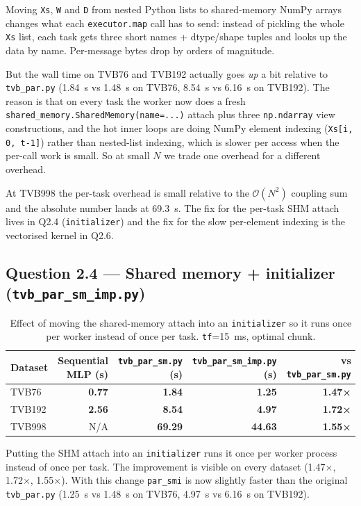 \documentclass[11pt,a4paper]{article}
\newcommand{\Q}[1]{\subsection*{Question #1}}
\begin{document}
Moving \texttt{Xs}, \texttt{W} and \texttt{D} from nested Python
lists to shared-memory NumPy arrays changes what each
\texttt{executor.map} call has to send: instead of pickling the whole
\texttt{Xs} list, each task gets three short names + dtype/shape
tuples and looks up the data by name. Per-message bytes drop by
orders of magnitude.

But the wall time on TVB76 and TVB192 actually goes \emph{up} a bit
relative to \texttt{tvb\_par.py} (1.84~s vs 1.48~s on TVB76, 8.54~s
vs 6.16~s on TVB192). The reason is that on every task the worker
now does a fresh \texttt{shared\_memory.SharedMemory(name=...)}
attach plus three \texttt{np.ndarray} view constructions, and the
hot inner loops are doing NumPy element indexing (\texttt{Xs[i, 0,
t-1]}) rather than nested-list indexing, which is slower per access
when the per-call work is small. So at small $N$ we trade one
overhead for a different overhead.

At TVB998 the per-task overhead is small relative to the
$\mathcal{O}(N^2)$ coupling sum and the absolute number lands at
69.3~s. The fix for the per-task SHM attach lives in Q2.4
(\texttt{initializer}) and the fix for the slow per-element
indexing is the vectorised kernel in Q2.6.

\Q{2.4 — Shared memory + initializer (\texttt{tvb\_par\_sm\_imp.py})}

\begin{table}[h]
\centering
\small
\begin{tabular}{lrrrr}
\toprule
Dataset & Sequential MLP (s) & \texttt{tvb\_par\_sm.py} (s) & \texttt{tvb\_par\_sm\_imp.py} (s) & vs \texttt{tvb\_par\_sm.py} \\
\midrule
TVB76  & \textbf{0.77}  & \textbf{1.84}  & \textbf{1.25}  & \textbf{1.47×} \\
TVB192 & \textbf{2.56} & \textbf{8.54} & \textbf{4.97} & \textbf{1.72×} \\
TVB998 & N/A                              & \textbf{69.29} & \textbf{44.63} & \textbf{1.55×} \\
\bottomrule
\end{tabular}
\caption{Effect of moving the shared-memory attach into an
\texttt{initializer} so it runs once per worker instead of once per
task. \texttt{tf}=15~ms, optimal chunk.}
\end{table}

Putting the SHM attach into an \texttt{initializer} runs it once per
worker process instead of once per task. The improvement is visible
on every dataset (1.47$\times$, 1.72$\times$, 1.55$\times$). With
this change \texttt{par\_smi} is now slightly faster than the
original \texttt{tvb\_par.py} (1.25~s vs 1.48~s on TVB76, 4.97~s vs
6.16~s on TVB192).
\end{document}
